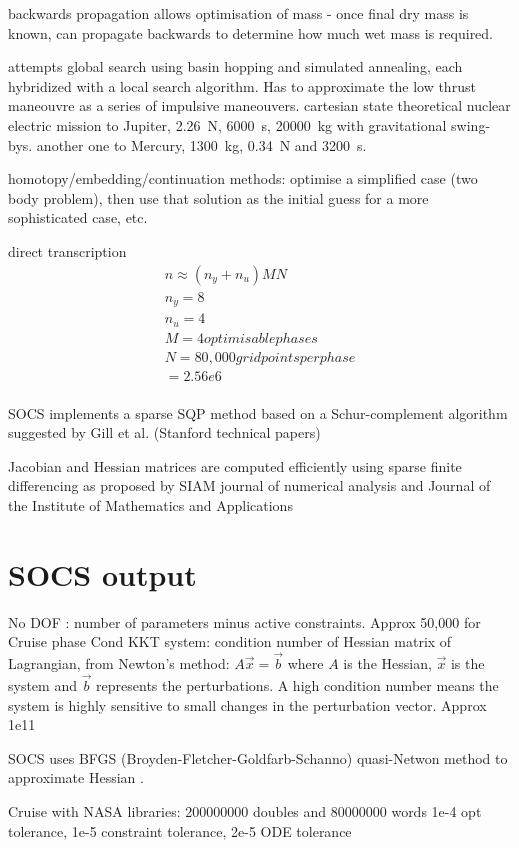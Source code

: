 backwards propagation allows optimisation of mass - once final dry mass is known, can propagate backwards to determine how much wet mass is required.


\cite{Yam2011} attempts global search using basin hopping and simulated annealing, each hybridized with a local search algorithm. Has to approximate the low thrust maneouvre as a series of impulsive maneouvers.
cartesian state
theoretical nuclear electric mission to Jupiter, 2.26~N, 6000~s, 20000~kg with gravitational swing-bys.
another one to Mercury, 1300~kg, 0.34~N and 3200~s.


homotopy/embedding/continuation methods: optimise a simplified case (two body problem), then use that solution as the initial guess for a more sophisticated case, etc.


direct transcription
\begin{subequations}
\begin{gather}
n \approx (n_y + n_u)MN \\
n_y = 8 \\
n_u = 4 \\
M = 4 optimisable phases \\
N = 80,000 grid points per phase \\
=2.56e6 \\
\end{gather}
\end{subequations}
\cite{Betts1998}

SOCS implements a sparse SQP method based on a Schur-complement algorithm suggested by Gill et al. (Stanford technical papers)

Jacobian and Hessian matrices are computed efficiently using sparse finite differencing as proposed by \cite{Coleman1983} SIAM journal of numerical analysis and \cite{Curtis1974} Journal of the Institute of Mathematics and Applications

\section{SOCS output}
No DOF : number of parameters minus active constraints. Approx 50,000 for Cruise phase
Cond KKT system: condition number of Hessian matrix of Lagrangian, from Newton's method: $A\vec{x}=\vec{b}$ where $A$ is the Hessian, $\vec{x}$ is the system and $\vec{b}$ represents the perturbations. A high condition number means the system is highly sensitive to small changes in the perturbation vector. Approx 1e11

SOCS uses BFGS (Broyden-Fletcher-Goldfarb-Schanno) quasi-Netwon method to approximate Hessian .

Cruise with NASA libraries: 200000000 doubles and 80000000 words
1e-4 opt tolerance, 1e-5 constraint tolerance, 2e-5 ODE tolerance